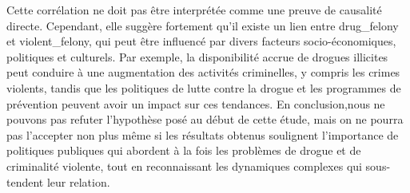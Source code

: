 \documentclass[
]{article}
\begin{document}
Cette corrélation ne doit pas être interprétée comme une preuve de
causalité directe. Cependant, elle suggère fortement qu'il existe un
lien entre drug\_felony et violent\_felony, qui peut être influencé par
divers facteurs socio-économiques, politiques et culturels. Par exemple,
la disponibilité accrue de drogues illicites peut conduire à une
augmentation des activités criminelles, y compris les crimes violents,
tandis que les politiques de lutte contre la drogue et les programmes de
prévention peuvent avoir un impact sur ces tendances. En conclusion,nous
ne pouvons pas refuter l'hypothèse posé au début de cette étude, mais on
ne pourra pas l'accepter non plus même si les résultats obtenus
soulignent l'importance de politiques publiques qui abordent à la fois
les problèmes de drogue et de criminalité violente, tout en
reconnaissant les dynamiques complexes qui sous-tendent leur relation.
\end{document}
